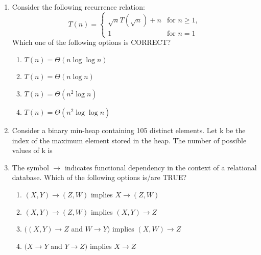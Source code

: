 \documentclass[a4paper, 11pt]{article}
\begin{document}
\begin{enumerate}
    \item Consider the following recurrence relation:
    \[ T(n) = \begin{cases} \sqrt{n}T(\sqrt{n}) + n & \text{for } n \ge 1, \\ 1 & \text{for } n=1 \end{cases} \]
    Which one of the following options is CORRECT?

    \begin{enumerate}
        \item $T(n) = \Theta(n \log \log n)$
        \item $T(n) = \Theta(n \log n)$
        \item $T(n) = \Theta(n^2 \log n)$
        \item $T(n) = \Theta(n^2 \log \log n)$
    \end{enumerate}
    \hfill{}
    \item Consider a binary min-heap containing 105 distinct elements. Let k be the index  of the maximum element stored in the heap. The number of possible values of k is
    \begin{enumerate}
    \end{enumerate}
    \hfill{}

    \item The symbol $\rightarrow$ indicates functional dependency in the context of a relational database. Which of the following options is/are TRUE?

    \begin{enumerate}
        \item $(X,Y) \rightarrow (Z,W)$ implies $X \rightarrow (Z,W)$
        \item $(X,Y) \rightarrow (Z,W)$ implies $(X,Y) \rightarrow Z$
        \item $((X,Y) \rightarrow Z$ and $W \rightarrow Y)$ implies $(X,W) \rightarrow Z$
        \item $(X \rightarrow Y$ and $Y \rightarrow Z)$ implies $X \rightarrow Z$
    \end{enumerate}
    \hfill{}


\end{enumerate}
\end{document}
